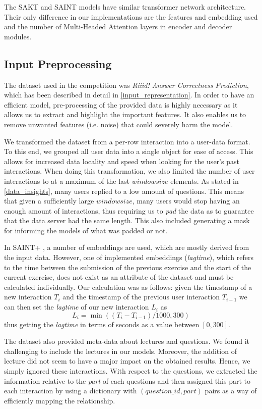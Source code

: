 \documentclass{article}
\begin{document}
The SAKT and SAINT models have similar transformer network architecture. Their only difference in our implementations are the features and embedding used and the number of Multi-Headed Attention layers in encoder and decoder modules.
\subsection{Input Preprocessing}
\label{input_preprocessing}
The dataset used in the competition was \emph{Riiid! Answer Correctness Prediction}, which has been described in detail in \autoref{input_representation}. In order to have an efficient model, pre-processing of the provided data is highly necessary as it allows us to extract and highlight the important features. It also enables us to remove unwanted features (i.e. noise) that could severely harm the model.

We transformed the dataset from a per-row interaction into a user-data format. To this end, we grouped all user data into a single object for ease of access. This allows for increased data locality and speed when looking for the user's past interactions. When doing this transformation, we also limited the number of user interactions to at a maximum of the last $windowsize$ elements. As stated in \autoref{data_insights}, many users replied to a low amount of questions. This means that given a sufficiently large $windowsize$, many users would stop having an enough amount of interactions, thus requiring us to \textit{pad} the data as to guarantee that the data server had the same length. This also included generating a mask for informing the models of what was padded or not.

In SAINT+ \cite{Shin2020}, a number of embeddings are used, which are mostly derived from the input data. However, one of implemented embeddings (\textit{lagtime}), which refers to the time between the submission of the previous exercise and the start of the current exercise, does not exist as an attribute of the dataset and must be calculated individually. Our calculation was as follows: given the timestamp of a new interaction $T_i$ and the timestamp of the previous user interaction $T_{i-1}$ we can then set the \textit{lagtime} of our new interaction $L_i$ as $$L_i = \min ((T_i - T_{i-1}) / 1000, 300)$$ thus getting the \textit{lagtime} in terms of seconds as a value between $[0, 300]$.
 
The dataset also provided meta-data about lectures and questions. We found it challenging to include the lectures in our models. Moreover, the addition of lecture did not seem to have a major impact on the obtained results. Hence, we simply ignored these interactions. With respect to the questions, we extracted the information relative to the \textit{part} of each questions and then assigned this part to each interaction by using a dictionary with $(question\_id, part)$ pairs as a way of efficiently mapping the relationship.
\end{document}

